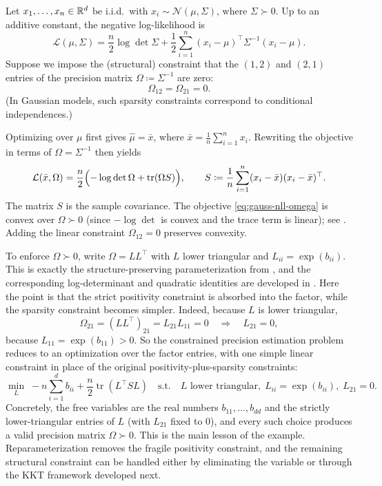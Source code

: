 \begin{example}
Let $x_1,\dots,x_n \in \mathbb{R}^d$ be i.i.d.\ with $x_i\sim \mathcal{N}(\mu,\Sigma)$, where $\Sigma\succ 0$.
Up to an additive constant, the negative log-likelihood is
\begin{equation}
  \mathcal{L}(\mu,\Sigma)
  = \frac{n}{2}\log\det\Sigma + \frac12\sum_{i=1}^n (x_i-\mu)^\top \Sigma^{-1}(x_i-\mu).
  \label{eq:gauss-nll}
\end{equation}
Suppose we impose the (structural) constraint that the $(1,2)$ and $(2,1)$ entries of the precision matrix $\Omega\coloneqq\Sigma^{-1}$ are zero:
\[
  \Omega_{12}=\Omega_{21}=0.
\]
(In Gaussian models, such sparsity constraints correspond to conditional independences.)

Optimizing over $\mu$ first gives $\hat\mu=\bar x$, where $\bar x=\frac1n\sum_{i=1}^n x_i$.
Rewriting the objective in terms of $\Omega=\Sigma^{-1}$ then yields
\begin{equation}
  \mathcal{L}(\bar x,\Omega)
  = \frac{n}{2}\Bigl(-\log\det\Omega + \operatorname{tr}(\Omega S)\Bigr),
  \qquad
  S \coloneqq \frac1n\sum_{i=1}^n (x_i-\bar x)(x_i-\bar x)^\top.
  \label{eq:gauss-nll-omega}
\end{equation}
The matrix $S$ is the sample covariance.
The objective \eqref{eq:gauss-nll-omega} is convex over $\Omega\succ 0$ (since $-\log\det$ is convex and the trace term is linear); see \citet[\S3.1.5]{boyd_vandenberghe_2004_convex}.
Adding the linear constraint $\Omega_{12}=0$ preserves convexity.

To enforce $\Omega\succ 0$, write $\Omega = LL^\top$ with $L$ lower triangular and $L_{ii}=\exp(b_{ii})$.
This is exactly the structure-preserving parameterization from , and the corresponding log-determinant and quadratic identities are developed in .
Here the point is that the strict positivity constraint is absorbed into the factor, while the sparsity constraint becomes simpler.
Indeed, because $L$ is lower triangular,
\[
  \Omega_{21} = (LL^\top)_{21} = L_{21}L_{11} = 0 \quad \Rightarrow \quad L_{21}=0,
\]
because $L_{11}=\exp(b_{11})>0$.
So the constrained precision estimation problem reduces to an optimization over the factor entries, with one simple linear constraint in place of the original positivity-plus-sparsity constraints:
\begin{equation}
  \min_{L}\;
  -n\sum_{i=1}^d b_{ii} + \frac{n}{2}\operatorname{tr}(L^\top S L)
  \quad\text{s.t.}\quad
  L \text{ lower triangular},\; L_{ii}=\exp(b_{ii}),\; L_{21}=0.
  \label{eq:gauss-precision-cholesky}
\end{equation}
Concretely, the free variables are the real numbers $b_{11},\dots,b_{dd}$ and the strictly lower-triangular entries of $L$ (with $L_{21}$ fixed to $0$), and every such choice produces a valid precision matrix $\Omega\succ 0$.
This is the main lesson of the example.
Reparameterization removes the fragile positivity constraint, and the remaining structural constraint can be handled either by eliminating the variable or through the KKT framework developed next.
\end{example}

